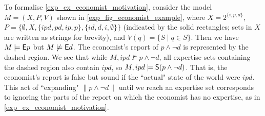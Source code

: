 
\def\w{1}
\def\h{0.4}
\newcommand{\examplemodel}{
    \tikzset{mynode/.style={color=black}}
    \node[mynode] (a) at (0, 0) {$ipd$};
    \node[mynode] (b) at (\w, 0) {$pd$};
    \node[mynode] (c) at (0, \h) {$ip$};
    \node[mynode] (d) at (\w, \h) {$p$};
    \node[mynode] (e) at (0, 2*\h) {$id$};
    \node[mynode] (f) at (\w, 2*\h) {$d$};
    \node[mynode] (g) at (0, 3*\h) {$i$};
    \node[mynode] (h) at (\w, 3*\h) {$\emptyset$};
}

\begin{example}
    \label{exp_ex_economist_formalisation}

    To formalise \cref{exp_ex_economist_motivation}, consider the model $M = (X, P,
    V)$ shown in \cref{exp_fig_economist_example}, where $X =
    2^{\{i,p,d\}}$, $P = \{\emptyset, X, \{ipd,pd,ip,p\},
    \{id,d,i,\emptyset\}\}$ (indicated by the solid rectangles; sets in $X$ are
    written as strings for brevity), and $V(q) =
    \{S \mid q \in S\}$. Then we have $M \models \E p$ but $M \not\models \E
    d$. The economist's report of $p \land \neg d$ is represented by the dashed
    region. We see that while $M, ipd \not\models p \land \neg d$, all
    expertise sets containing the dashed region also contain $ipd$, so $M, ipd
    \models \S(p \land \neg d)$. That is, the economist's report is false but
    sound if the ``actual" state of the world were $ipd$. This act of
    ``expanding" $\|p \land \neg d\|$ until we reach an expertise set
    corresponds to ignoring the parts of the report on which the economist has
    no expertise, as in \cref{exp_ex_economist_motivation}.

\end{example}

